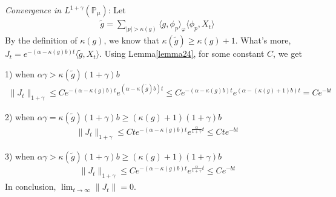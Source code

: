 \documentclass{article}
\begin{document}
{\em Convergence in $L^{1+\gamma}(\mathbb{P}_{\mu})$}:
Let
\begin{align*}
    \tilde{g}=\sum_{|p|> \kappa(g)}\langle g,\phi_p\rangle_\varphi \langle \phi_p,X_t\rangle
\end{align*}
By the definition of $\kappa(g)$, we know that $\kappa(\tilde{g})\geq \kappa(g)+1$. What's more, $J_t=e^{-(\alpha-\kappa(g)b)t}\langle \tilde{g},X_t\rangle$. 
Using Lemma\ref{lemma24}, for some constant $C$, we get

1) when $\alpha\gamma>\kappa(\tilde{g})(1+\gamma)b$
\begin{align*}
    \|J_t\|_{1+\gamma}\leq C e^{-(\alpha-\kappa(g)b)t}e^{(\alpha-\kappa(\tilde{g})b)t}\leq C  e^{-(\alpha-\kappa(g)b)t}e^{(\alpha-(\kappa(g)+1)b)t}=C e^{-bt}
\end{align*}

2) when $\alpha\gamma=\kappa(\tilde{g})(1+\gamma)b\geq (\kappa(g)+1)(1+\gamma)b$
\begin{align*}
     \|J_t\|_{1+\gamma}\leq C t e^{-(\alpha-\kappa(g)b)t}e^{\frac{\alpha}{1+\gamma}t}\leq C t e^{-bt}
\end{align*}

3) when $\alpha\gamma>\kappa(\tilde{g})(1+\gamma)b\geq (\kappa(g)+1)(1+\gamma)b$
\begin{align*}
    \|J_t\|_{1+\gamma}\leq C e^{-(\alpha-\kappa(g)b)t}e^{\frac{\alpha}{1+\gamma}t}\leq C e^{-bt}
\end{align*}
In conclusion, $\lim_{t\rightarrow \infty}\|J_t\|=0$.
\end{document}

